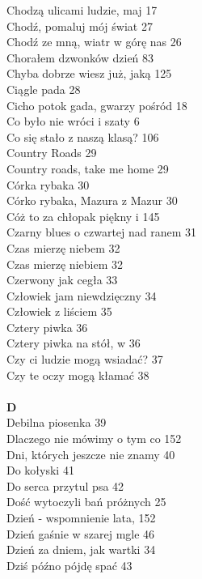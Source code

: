 \documentclass[a5paper, 10pt]{book}
\begin{document}
{\begin{multicols}{3}
    Chodzą ulicami ludzie, maj 17\\
    Chodź, pomaluj mój świat 27\\
    Chodź ze mną, wiatr w górę nas 26\\
    Chorałem dzwonków dzień 83\\
    Chyba dobrze wiesz już, jaką 125\\
    Ciągle pada 28\\
    Cicho potok gada, gwarzy pośród 18\\
    Co było nie wróci i szaty 6\\
    Co się stało z naszą klasą? 106\\
    Country Roads 29\\
    Country roads, take me home 29\\
    Córka rybaka 30\\
    Córko rybaka, Mazura z Mazur 30\\
    Cóż to za chłopak piękny i 145\\
    Czarny blues o czwartej nad ranem 31\\
    Czas mierzę niebem 32\\
    Czas mierzę niebiem 32\\
    Czerwony jak cegła 33\\
    Człowiek jam niewdzięczny 34\\
    Człowiek z liściem 35\\
    Cztery piwka 36\\
    Cztery piwka na stół, w 36\\
    Czy ci ludzie mogą wsiadać? 37\\
    Czy te oczy mogą kłamać 38\\
    \\
    {\footnotesize \textbf{D\\} }
    Debilna piosenka 39\\
    Dlaczego nie mówimy o tym co 152\\
    Dni, których jeszcze nie znamy 40\\
    Do kołyski 41\\
    Do serca przytul psa 42\\
    Dość wytoczyli bań próżnych 25\\
    Dzień - wspomnienie lata, 152\\
    Dzień gaśnie w szarej mgle 46\\
    Dzień za dniem, jak wartki 34\\
    Dziś późno pójdę spać 43\\

\end{multicols}}
\end{document}
